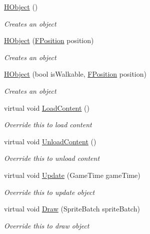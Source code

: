 \begin{DoxyCompactItemize}
\item 
\hyperlink{class_hel_project_1_1_game_world_1_1_h_object_ac10ea2725a0721b3f60d8e04bc89eda5}{H\+Object} ()
\begin{DoxyCompactList}\small\item\em Creates an object \end{DoxyCompactList}\item 
\hyperlink{class_hel_project_1_1_game_world_1_1_h_object_ae8ff8fe02b0ed2a9928f863757ccb8d5}{H\+Object} (\hyperlink{class_hel_project_1_1_tools_1_1_f_position}{F\+Position} position)
\begin{DoxyCompactList}\small\item\em Creates an object \end{DoxyCompactList}\item 
\hyperlink{class_hel_project_1_1_game_world_1_1_h_object_a66675ff8875b73497dfaee22decacf9d}{H\+Object} (bool is\+Walkable, \hyperlink{class_hel_project_1_1_tools_1_1_f_position}{F\+Position} position)
\begin{DoxyCompactList}\small\item\em Creates an object \end{DoxyCompactList}\item 
virtual void \hyperlink{class_hel_project_1_1_game_world_1_1_h_object_a2de39710b20f7af4e1e2463ca93656f8}{Load\+Content} ()
\begin{DoxyCompactList}\small\item\em Override this to load content \end{DoxyCompactList}\item 
virtual void \hyperlink{class_hel_project_1_1_game_world_1_1_h_object_a30efa177423e89a85e45b76fe35d6724}{Unload\+Content} ()
\begin{DoxyCompactList}\small\item\em Override this to unload content \end{DoxyCompactList}\item 
virtual void \hyperlink{class_hel_project_1_1_game_world_1_1_h_object_a2e4ba3d334e48c9b74cc1b2b821f030b}{Update} (Game\+Time game\+Time)
\begin{DoxyCompactList}\small\item\em Override this to update object \end{DoxyCompactList}\item 
virtual void \hyperlink{class_hel_project_1_1_game_world_1_1_h_object_aa48c9288756739f80a59bdf6f4fe7f3f}{Draw} (Sprite\+Batch sprite\+Batch)
\begin{DoxyCompactList}\small\item\em Override this to draw object \end{DoxyCompactList}\end{DoxyCompactItemize}
